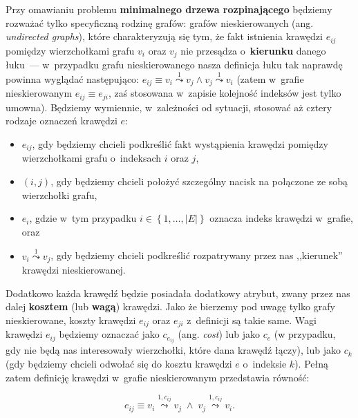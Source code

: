 Przy omawianiu problemu \textbf{minimalnego drzewa rozpinającego} będziemy rozważać tylko specyficzną rodzinę grafów: grafów nieskierowanych (ang. \textit{undirected graphs}), które charakteryzują się tym, że fakt istnienia krawędzi $e_{ij}$ pomiędzy wierzchołkami grafu $v_{i}$ oraz $v_{j}$ nie przesądza o~\textbf{kierunku} danego łuku~--- w~przypadku grafu nieskierowanego nasza definicja łuku tak naprawdę powinna wyglądać następująco: $e_{ij} \equiv v_{i} \overset{1}{\leadsto} v_{j} \wedge v_{j} \overset{1}{\leadsto} v_{i}$ (zatem w~grafie nieskierowanym $e_{ij} \equiv e_{ji}$, zaś stosowana w~zapisie kolejność indeksów jest tylko umowna).
Będziemy wymiennie, w~zależności od sytuacji, stosować aż cztery rodzaje oznaczeń krawędzi $e$:

\begin{itemize}
	\item $e_{ij}$, gdy będziemy chcieli podkreślić fakt wystąpienia krawędzi pomiędzy wierzchołkami grafu o~indeksach $i$ oraz $j$,
	\item $\left( i, j \right)$, gdy będziemy chcieli położyć szczególny nacisk na połączone ze sobą wierzchołki grafu,
	\item $e_{i}$, gdzie w~tym przypadku $i \in \left\{ 1, \dots, \left| E \right| \right\}$ oznacza indeks krawędzi w~grafie, oraz
	\item $v_{i} \overset{1}{\leadsto} v_{j}$, gdy będziemy chcieli podkreślić rozpatrywany przez nas ,,kierunek'' krawędzi nieskierowanej.
\end{itemize}

Dodatkowo każda krawędź będzie posiadała dodatkowy atrybut, zwany przez nas dalej \textbf{kosztem} (lub \textbf{wagą}) krawędzi.
Jako że bierzemy pod uwagę tylko grafy nieskierowane, koszty krawędzi $e_{ij}$ oraz $e_{ji}$ z~definicji są takie same.
Wagi krawędzi $e_{ij}$ będziemy oznaczać jako $c_{e_{ij}}$ (ang. \textit{cost}) lub jako $c_{e}$ (w przypadku, gdy nie będą nas interesowały wierzchołki, które dana krawędź łączy), lub jako $c_{k}$ (gdy będziemy chcieli odwołać się do kosztu krawędzi $e$ o~indeksie $k$).
Pełną zatem definicję krawędzi w~grafie nieskierowanym przedstawia równość:

\begin{equation}
	e_{ij} \equiv v_{i} \overset{1, c_{ij}}{\leadsto} v_{j} \; \wedge \; v_{j} \overset{1, c_{ij}}{\leadsto} v_{i}\text{.}
\end{equation}

